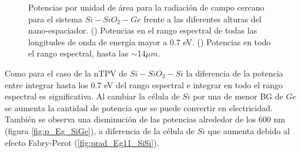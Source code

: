 \begin{figure}[H]
\begin{subfigure}[b]{0.49\textwidth}
	\caption{ }
	\label{fig:p_full_SiGe}
\end{subfigure}
	\caption[Potencias por unidad de área para la radiación de campo cercano para el sistema $Si-SiO_2-Ge$ frente a las diferentes alturas del nano-espaciador]{Potencias por unidad de área para la radiación de campo cercano para el sistema $Si-SiO_2-Ge$ frente a las diferentes alturas del nano-espaciador. () Potencias en el rango espectral de todas las longitudes de onda de energía mayor a 0.7 eV. () Potencias en todo el rango espectral, hasta las $\sim$14$\mu m$.}
	\label{fig:p_SiGe}
\end{figure}
Como para el caso de la nTPV de $Si-SiO_2-Si$ la diferencia de la potencia entre integrar hasta los 0.7 eV del rango espectral e integrar en todo el rango espectral es significativa. Al cambiar la célula de $Si$ por una de menor BG de $Ge$ se aumenta la cantidad de potencia que se puede convertir en electricidad. También se observa una disminución de las potencias alrededor de los 600 nm (figura \ref{fig:p_Eg_SiGe}), a diferencia de la célula de $Si$ que aumenta debido al efecto Fabry-Perot (\ref{fig:prad_Eg11_SiSi}).
